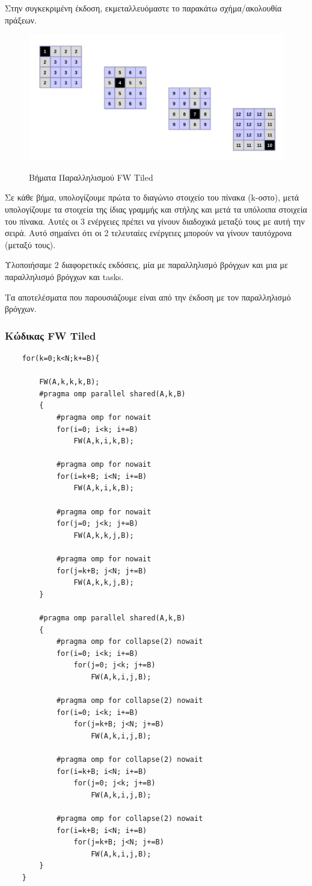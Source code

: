 \documentclass[../final_report.tex]{subfiles}
\begin{document}
Στην συγκεκριμένη έκδοση, εκμεταλλευόμαστε το παρακάτω σχήμα/ακολουθία πράξεων.

\begin{figure}[H]
    \centering
    \caption{Βήματα Παραλληλισμού FW Tiled}
    \includegraphics[scale=0.5]{tiledDependencies.png}
    \label{fig: Βήματα Παραλληλισμού FW Tiled}
\end{figure}

Σε κάθε βήμα, υπολογίζουμε πρώτα το διαγώνιο στοιχείο του πίνακα (k-οστο),
μετά υπολογίζουμε τα στοιχεία της ίδιας γραμμής και στήλης και μετά τα υπόλοιπα
στοιχεία του πίνακα. Αυτές οι 3 ενέργειες πρέπει να γίνουν διαδοχικά μεταξύ τους με
αυτή την σειρά. Αυτό σημαίνει ότι οι 2 τελευταίες ενέργειες μπορούν να γίνουν ταυτόχρονα (μεταξύ τους).

Υλοποιήσαμε 2 διαφορετικές εκδόσεις, μία με παραλληλισμό βρόγχων και μια με παραλληλισμό
βρόγχων και tasks.

Τα αποτελέσματα που παρουσιάζουμε είναι από την έκδοση με τον παραλληλισμό βρόγχων.

\subsubsection*{Κώδικας FW Tiled}


\begin{lstlisting}
    for(k=0;k<N;k+=B){

		FW(A,k,k,k,B);
		#pragma omp parallel shared(A,k,B)
		{
			#pragma omp for nowait
			for(i=0; i<k; i+=B)
				FW(A,k,i,k,B);

			#pragma omp for nowait
			for(i=k+B; i<N; i+=B)
				FW(A,k,i,k,B);

			#pragma omp for nowait
			for(j=0; j<k; j+=B)
				FW(A,k,k,j,B);

			#pragma omp for nowait
			for(j=k+B; j<N; j+=B)	
				FW(A,k,k,j,B);
		}

		#pragma omp parallel shared(A,k,B)
		{
			#pragma omp for collapse(2) nowait
			for(i=0; i<k; i+=B)
				for(j=0; j<k; j+=B)
					FW(A,k,i,j,B);

			#pragma omp for collapse(2) nowait
			for(i=0; i<k; i+=B)
				for(j=k+B; j<N; j+=B)
					FW(A,k,i,j,B);

			#pragma omp for collapse(2) nowait
			for(i=k+B; i<N; i+=B)
				for(j=0; j<k; j+=B)
					FW(A,k,i,j,B);

			#pragma omp for collapse(2) nowait
			for(i=k+B; i<N; i+=B)
				for(j=k+B; j<N; j+=B)
					FW(A,k,i,j,B);
		}
	}
\end{lstlisting}
\end{document}

